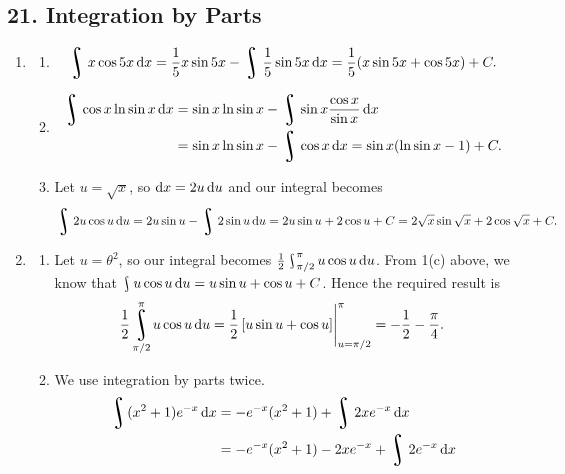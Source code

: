 \subsection*{21. Integration by Parts}
\begin{enumerate}
  \item
    \begin{enumerate}
      \item
        \begin{displaymath}
          \rint x \cos 5x \dif{x} = \frac{1}{5} x \sin 5x - \rint \frac{1}{5}\sin 5x \dif{x} = \frac{1}{5}(x\sin 5x + \cos 5x) + C.
        \end{displaymath}
      \item
        \begin{align*}
          \rint \cos x \ln \sin x \dif{x} &= \sin x \ln \sin x - \rint \sin x \frac{\cos x}{\sin x} \dif{x}\\
                                          &= \sin x \ln \sin x - \rint \cos x \dif{x} = \sin x (\ln \sin x - 1) + C.
        \end{align*}
      \item Let $ u = \sqrt{x} $, so $ \dif{x} = 2u \dif{u} $ and our integral becomes
            \begin{displaymath}
              \rint 2u \cos u \dif{u} = 2u\sin u - \rint 2\sin u \dif{u} = 2u \sin u + 2\cos u + C = 2\sqrt{x} \sin \sqrt{x} + 2 \cos \sqrt{x} + C.
            \end{displaymath}
    \end{enumerate}
  \item
    \begin{enumerate}
      \item Let $ u = \theta^2 $, so our integral becomes $ \frac{1}{2} \rint^\pi_{\pi/2}  u \cos u \dif{u} $. From 1(c) above,
            we know that $ \rint u \cos u \dif{u} = u \sin u + \cos u + C $. Hence the required result is
            \begin{displaymath}
              \frac{1}{2} \rint^\pi_{\pi/2}  u \cos u \dif{u} = \frac{1}{2} \eval{\left[u \sin u + \cos u\right]}_{u = \pi/2}^{\pi} = -\frac{1}{2} - \frac{\pi}{4}.
            \end{displaymath}
      \item We use integration by parts twice.
            \begin{align*}
              \rint (x^2 + 1)e^{-x} \dif{x} &= -e^{-x}(x^2 + 1) + \rint 2x e^{-x} \dif{x}\\
                                            &= -e^{-x}(x^2 + 1) - 2xe^{-x} + \rint 2e^{-x} \dif{x}\\

\end{align*}
\end{enumerate}
\end{enumerate}
